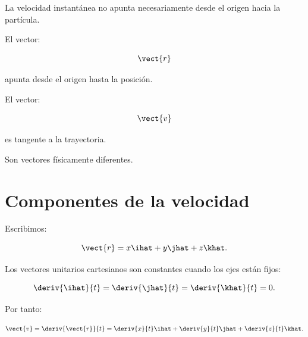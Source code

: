 \begin{center}
\end{center}

\begin{errorfrecuente}
La velocidad instantánea no apunta necesariamente desde el origen hacia la
partícula.

El vector:

\[
\vect{r}
\]

apunta desde el origen hasta la posición.

El vector:

\[
\vect{v}
\]

es tangente a la trayectoria.

Son vectores físicamente diferentes.
\end{errorfrecuente}


\section{Componentes de la velocidad}

Escribimos:

\[
\vect{r}
=
x\ihat+y\jhat+z\khat.
\]

Los vectores unitarios cartesianos son constantes cuando los ejes están fijos:

\[
\deriv{\ihat}{t}
=
\deriv{\jhat}{t}
=
\deriv{\khat}{t}
=
0.
\]

Por tanto:

\[
\vect{v}
=
\deriv{\vect{r}}{t}
=
\deriv{x}{t}\ihat
+
\deriv{y}{t}\jhat
+
\deriv{z}{t}\khat.
\]

